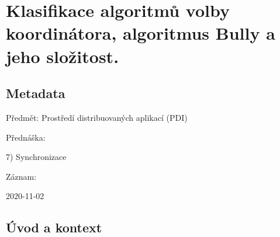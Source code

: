 

\graphicspath{{pdi/volba_koordinatora}}


\chapter{Klasifikace algoritmů volby koordinátora, algoritmus Bully a jeho složitost.}


\section{Metadata}

\begin{compactitem}
    \item Předmět: Prostředí distribuovaných aplikací (PDI)
    \item Přednáška:
    \begin{compactitem}
        \item 7) Synchronizace
    \end{compactitem}
    \item Záznam:
    \begin{compactitem}
        \item 2020-11-02
    \end{compactitem}
\end{compactitem}


\section{Úvod a kontext}


